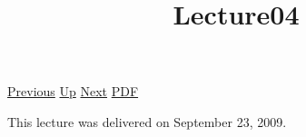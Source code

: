 \documentclass[12pt,a4paper]{report}
\begin{document}
 \href{doc/phil/People/Brandom/OnSellars/2009/Lecture03.html}{Previous} 
 \href{doc/phil/People/Brandom/OnSellars/2009.html}{Up} 
 \href{doc/phil/People/Brandom/OnSellars/2009/Lecture05.html}{Next} 
 \href{doc/phil/People/Brandom/OnSellars/2009/Lecture04.pdf}{PDF} 
\title{Lecture04}

\tableofcontents
This lecture was delivered on September 23, 2009.
\end{document}
